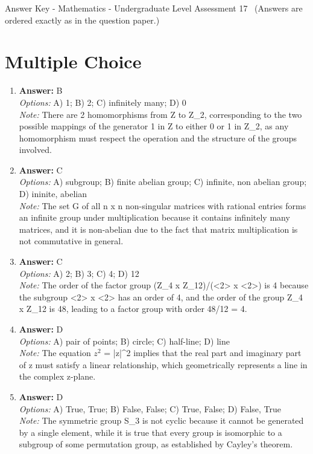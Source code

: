 \documentclass[12pt]{article}
\begin{document}
\begin{center}
Answer Key - Mathematics - Undergraduate Level Assessment 17 \
\small (Answers are ordered exactly as in the question paper.)
\end{center}

\section*{Multiple Choice}
\begin{enumerate}[label=\arabic*.]
\item \textbf{Answer:} B
\\ \textit{Options:} A) 1; B) 2; C) infinitely many; D) 0
\\ \textit{Note:} There are 2 homomorphisms from Z to Z\_2, corresponding to the two possible mappings of the generator 1 in Z to either 0 or 1 in Z\_2, as any homomorphism must respect the operation and the structure of the groups involved.
\item \textbf{Answer:} C
\\ \textit{Options:} A) subgroup; B) finite abelian group; C) infinite, non abelian group; D) ininite, abelian
\\ \textit{Note:} The set G of all n x n non-singular matrices with rational entries forms an infinite group under multiplication because it contains infinitely many matrices, and it is non-abelian due to the fact that matrix multiplication is not commutative in general.
\item \textbf{Answer:} C
\\ \textit{Options:} A) 2; B) 3; C) 4; D) 12
\\ \textit{Note:} The order of the factor group (Z\_4 x Z\_12)/(\textless{}2\textgreater{} x \textless{}2\textgreater{}) is 4 because the subgroup \textless{}2\textgreater{} x \textless{}2\textgreater{} has an order of 4, and the order of the group Z\_4 x Z\_12 is 48, leading to a factor group with order 48/12 = 4.
\item \textbf{Answer:} D
\\ \textit{Options:} A) pair of points; B) circle; C) half-line; D) line
\\ \textit{Note:} The equation $z^2$ = |z|^2 implies that the real part and imaginary part of z must satisfy a linear relationship, which geometrically represents a line in the complex z-plane.
\item \textbf{Answer:} D
\\ \textit{Options:} A) True, True; B) False, False; C) True, False; D) False, True
\\ \textit{Note:} The symmetric group S\_3 is not cyclic because it cannot be generated by a single element, while it is true that every group is isomorphic to a subgroup of some permutation group, as established by Cayley's theorem.
\end{enumerate}
\end{document}
